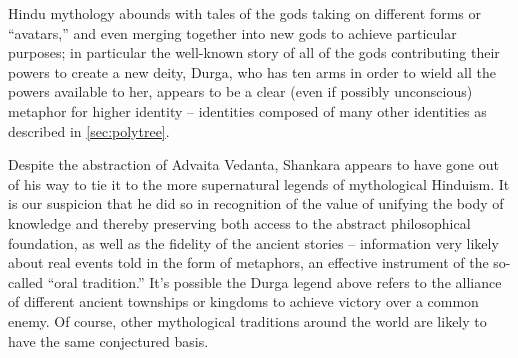 \documentclass[pra,twocolumn,groupedaddress,10pt]{revtex4}
\theoremstyle{definition}
\begin{document}
Hindu mythology abounds with tales of the gods taking on different forms or ``avatars,'' and even merging together into new gods to achieve particular purposes; in particular the well-known story of all of the gods contributing their powers to create a new deity, Durga, who has ten arms in order to wield all the powers available to her, appears to be a clear (even if possibly unconscious) metaphor for higher identity -- identities composed of many other identities as described in \autoref{sec:polytree}.

Despite the abstraction of Advaita Vedanta, Shankara appears to have gone out of his way to tie it to the more supernatural legends of mythological Hinduism. It is our suspicion that he did so in recognition of the value of unifying the body of knowledge and thereby preserving both access to the abstract philosophical foundation, as well as the fidelity of the ancient stories -- information very likely about real events told in the form of metaphors, an effective instrument of the so-called ``oral tradition.'' It's possible the Durga legend above refers to the alliance of different ancient townships or kingdoms to achieve victory over a common enemy. Of course, other mythological traditions around the world are likely to have the same conjectured basis.
\end{document}
